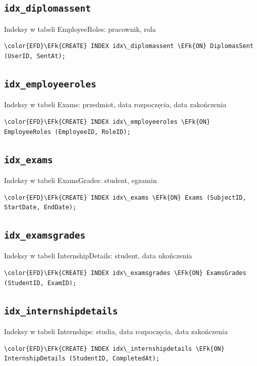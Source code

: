 \documentclass[11pt]{article}
\newcommand{\EFk}[1]{\textcolor{EFk}{\textbf{#1}}} %
\begin{document}
\subsection{\texttt{idx\_diplomassent}}
\label{sec:orgb5a3840}
Indeksy w tabeli EmployeeRoles: pracownik, rola
\begin{Code}
\begin{Verbatim}
\color{EFD}\EFk{CREATE} INDEX idx\_diplomassent \EFk{ON} DiplomasSent (UserID, SentAt);
\end{Verbatim}
\end{Code}
\subsection{\texttt{idx\_employeeroles}}
\label{sec:org9f3dfa5}
Indeksy w tabeli Exams: przedmiot, data rozpoczęcia, data zakończenia
\begin{Code}
\begin{Verbatim}
\color{EFD}\EFk{CREATE} INDEX idx\_employeeroles \EFk{ON} EmployeeRoles (EmployeeID, RoleID);
\end{Verbatim}
\end{Code}
\subsection{\texttt{idx\_exams}}
\label{sec:org23123ce}
Indeksy w tabeli ExamsGrades: student, egzamin
\begin{Code}
\begin{Verbatim}
\color{EFD}\EFk{CREATE} INDEX idx\_exams \EFk{ON} Exams (SubjectID, StartDate, EndDate);
\end{Verbatim}
\end{Code}
\subsection{\texttt{idx\_examsgrades}}
\label{sec:org3748007}
Indeksy w tabeli InternshipDetails: student, data ukończenia
\begin{Code}
\begin{Verbatim}
\color{EFD}\EFk{CREATE} INDEX idx\_examsgrades \EFk{ON} ExamsGrades (StudentID, ExamID);
\end{Verbatim}
\end{Code}
\subsection{\texttt{idx\_internshipdetails}}
\label{sec:org94a1944}
Indeksy w tabeli Internships: studia, data rozpoczęcia, data zakończenia
\begin{Code}
\begin{Verbatim}
\color{EFD}\EFk{CREATE} INDEX idx\_internshipdetails \EFk{ON} InternshipDetails (StudentID, CompletedAt);
\end{Verbatim}
\end{Code}
\end{document}
